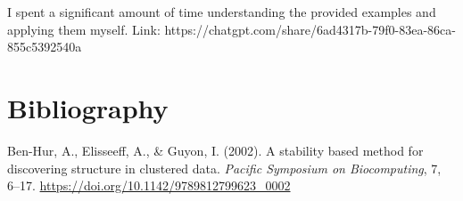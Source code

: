 \documentclass[10pt,letterpaper]{article}
\begin{document}
I spent a significant amount of time understanding the provided examples and applying them myself.
Link: https://chatgpt.com/share/6ad4317b-79f0-83ea-86ca-855c5392540a

\section{Bibliography}

Ben-Hur, A., Elisseeff, A., \& Guyon, I. (2002).
A stability based method for discovering structure in clustered data.
\textit{Pacific Symposium on Biocomputing}, 7, 6--17.
\url{https://doi.org/10.1142/9789812799623_0002}
\end{document}
